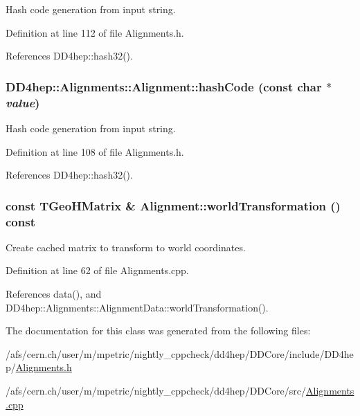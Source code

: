 Hash code generation from input string. 

Definition at line 112 of file Alignments.h.

References DD4hep::hash32().\hypertarget{class_d_d4hep_1_1_alignments_1_1_alignment_a18d349855ba9d9d8ae27949f9fbc020f}{
\subsubsection[{hashCode}]{ DD4hep::Alignments::Alignment::hashCode (const char $\ast$ {\em value})}}
\label{class_d_d4hep_1_1_alignments_1_1_alignment_a18d349855ba9d9d8ae27949f9fbc020f}


Hash code generation from input string. 

Definition at line 108 of file Alignments.h.

References DD4hep::hash32().\hypertarget{class_d_d4hep_1_1_alignments_1_1_alignment_a0b069295a059a0f5f235f8e183972b8f}{
\subsubsection[{worldTransformation}]{\setlength{\rightskip}{0pt plus 5cm}const TGeoHMatrix \& Alignment::worldTransformation () const}}
\label{class_d_d4hep_1_1_alignments_1_1_alignment_a0b069295a059a0f5f235f8e183972b8f}


Create cached matrix to transform to world coordinates. 

Definition at line 62 of file Alignments.cpp.

References data(), and DD4hep::Alignments::AlignmentData::worldTransformation().

The documentation for this class was generated from the following files:\begin{DoxyCompactItemize}
\item 
/afs/cern.ch/user/m/mpetric/nightly\_\-cppcheck/dd4hep/DDCore/include/DD4hep/\hyperlink{_alignments_8h}{Alignments.h}\item 
/afs/cern.ch/user/m/mpetric/nightly\_\-cppcheck/dd4hep/DDCore/src/\hyperlink{_alignments_8cpp}{Alignments.cpp}\end{DoxyCompactItemize}
